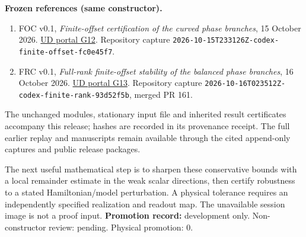 \documentclass[11pt,a4paper]{article}
\begin{document}
\textbf{Frozen references (same constructor).}
\begin{enumerate}
\item FOC v0.1, \emph{Finite-offset certification of the curved phase branches}, 15 October 2026. \href{https://unified-dynamics-public.ben-w-mayes.chatgpt.site/papers/\#finite-offset-v01}{UD portal G12}. Repository capture \texttt{2026-10-15T233126Z-codex-finite-offset-fc0e45f7}.
\item FRC v0.1, \emph{Full-rank finite-offset stability of the balanced phase branches}, 16 October 2026. \href{https://unified-dynamics-public.ben-w-mayes.chatgpt.site/papers/\#finite-rank-v01}{UD portal G13}. Repository capture \texttt{2026-10-16T023512Z-codex-finite-rank-93d52f5b}, merged PR 161.
\end{enumerate}
The unchanged modules, stationary input file and inherited result certificates accompany this release; hashes are recorded in its provenance receipt. The full earlier replay and manuscripts remain available through the cited append-only captures and public release packages.

The next useful mathematical step is to sharpen these conservative bounds with a local remainder estimate in the weak scalar directions, then certify robustness to a stated Hamiltonian/model perturbation. A physical tolerance requires an independently specified realization and readout map. The unavailable session image is not a proof input.
\vfill
\textbf{Promotion record:} development only. Non-constructor review: pending. Physical promotion: $0$.
\end{document}
